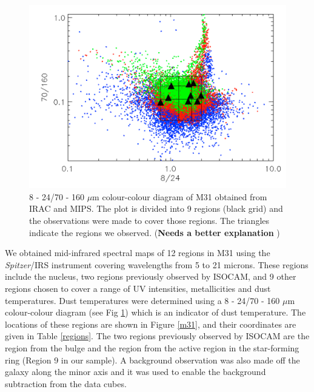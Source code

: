 \documentclass[useAMS,usenatbib,a4paper]{mn2e}
\begin{document}
\begin{figure}
\centering
\includegraphics[width = 8 cm]{./colormaps.png}
\caption{8 - 24/70 - 160 $\mu$m colour-colour diagram of M31 obtained from IRAC and MIPS. The plot is divided into 9 regions (black grid) and the observations were made to cover those regions. The triangles indicate the regions we observed. ({\bf Needs a better explanation} )}
\label{colourmaps}
\end{figure}

We obtained mid-infrared spectral maps of 12 regions in M31 using the {\em Spitzer}/IRS instrument \citep{IRS2004} covering wavelengths from 5 to 21 microns. These regions include the nucleus, two regions previously observed by ISOCAM, and 9 other regions chosen to cover a range of UV intensities, metallicities and dust temperatures. Dust temperatures were determined using a 8 - 24/70 - 160 $\mu$m colour-colour diagram (see Fig \ref{colourmaps}) which is an indicator of dust temperature. The locations of these regions are shown in Figure \ref{m31}, and their coordinates are given in Table \ref{regions}. The two regions previously observed by ISOCAM are the region from the bulge and the region from the active region in the star-forming ring (Region 9 in our sample). A background observation was also made off the galaxy along the minor axis and it was used to enable the background subtraction from the data cubes.
\end{document}
